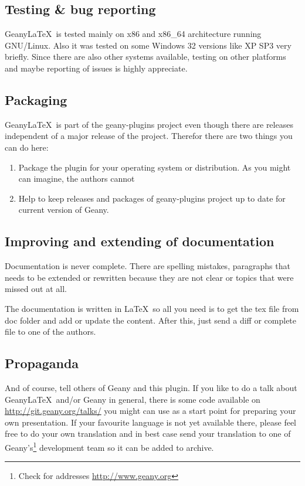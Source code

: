 \documentclass[%
a4paper,%
10pt,%
oneside,%
DIV18,
headsepline,
plainheadsepline,
footsepline,
plainfootsepline,
bibtotoc,%
liststotoc,%
BCOR12mm,%
halfparskip,%
openany,%
]{scrartcl}
\begin{document}
\subsection{Testing \& bug reporting}
Geany\LaTeX\ is tested mainly on x86 and x86\_64 architecture running
GNU/Linux. Also it was tested on some Windows 32 versions like XP SP3
very briefly. Since there are also other systems available, testing on other
platforms and maybe reporting of issues is highly appreciate.

\subsection{Packaging}
Geany\LaTeX\ is part of the geany-plugins project even though there
are releases independent of a major release of the project. Therefor
there are two things you can do here:
\begin{enumerate}
	\item Package the plugin for your operating system or
	distribution. As you might can imagine, the authors cannot
	\item Help to keep releases and packages of geany-plugins project
	up to date for current version of Geany.
\end{enumerate}

\subsection{Improving and extending of documentation}
Documentation is never complete. There are spelling mistakes,
paragraphs that needs to be extended or rewritten because they are not
clear or topics that were missed out at all.

The documentation is written in \LaTeX\ so all you need is to get the
tex file from doc folder and add or update the content.
After this, just send a diff or complete file to one of the authors.

\subsection{Propaganda}
And of course, tell others of Geany and this plugin. If you like to do
a talk about Geany\LaTeX\ and/or Geany in general, there is some code
available on \url{http://git.geany.org/talks/} you might can use as a
start point for preparing your own presentation. If your favourite
language is not yet available there, please feel free to do your own
translation and in best case send your translation to one of
Geany's\footnote{Check for addresses \url{http://www.geany.org}}
development team so it can be added to archive.
\end{document}
